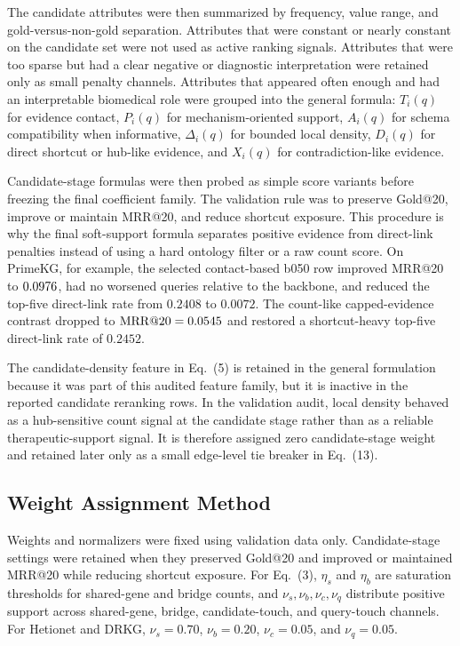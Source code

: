 \documentclass[11pt]{article}
\makeatletter
\newcommand{\mainequation}[1]{Eq.~(#1)}
\newcommand{\mrr}{MRR@20}
\newcommand{\gold}{Gold@20}
\makeatother
\begin{document}
    The candidate attributes were then summarized by frequency, value range, and gold-versus-non-gold separation. Attributes that were constant or nearly constant on the candidate set were not used as active ranking signals. Attributes that were too sparse but had a clear negative or diagnostic interpretation were retained only as small penalty channels. Attributes that appeared often enough and had an interpretable biomedical role were grouped into the general formula: \(T_i(q)\) for evidence contact, \(P_i(q)\) for mechanism-oriented support, \(A_i(q)\) for schema compatibility when informative, \(\Delta_i(q)\) for bounded local density, \(D_i(q)\) for direct shortcut or hub-like evidence, and \(X_i(q)\) for contradiction-like evidence.

    Candidate-stage formulas were then probed as simple score variants before freezing the final coefficient family. The validation rule was to preserve \gold{}, improve or maintain \mrr{}, and reduce shortcut exposure. This procedure is why the final soft-support formula separates positive evidence from direct-link penalties instead of using a hard ontology filter or a raw count score. On PrimeKG, for example, the selected contact-based b050 row improved \mrr{} to \(0.0976\), had no worsened queries relative to the backbone, and reduced the top-five direct-link rate from \(0.2408\) to \(0.0072\). The count-like capped-evidence contrast dropped to \(\mathrm{MRR@20}=0.0545\) and restored a shortcut-heavy top-five direct-link rate of \(0.2452\).

    The candidate-density feature in \mainequation{5} is retained in the general formulation because it was part of this audited feature family, but it is inactive in the reported candidate reranking rows. In the validation audit, local density behaved as a hub-sensitive count signal at the candidate stage rather than as a reliable therapeutic-support signal. It is therefore assigned zero candidate-stage weight and retained later only as a small edge-level tie breaker in \mainequation{13}.

    \subsection{Weight Assignment Method}

    Weights and normalizers were fixed using validation data only. Candidate-stage settings were retained when they preserved \gold{} and improved or maintained \mrr{} while reducing shortcut exposure. For \mainequation{3}, \(\eta_s\) and \(\eta_b\) are saturation thresholds for shared-gene and bridge counts, and \(\nu_s,\nu_b,\nu_c,\nu_q\) distribute positive support across shared-gene, bridge, candidate-touch, and query-touch channels. For Hetionet and DRKG, \(\nu_s=0.70\), \(\nu_b=0.20\), \(\nu_c=0.05\), and \(\nu_q=0.05\).
\end{document}
